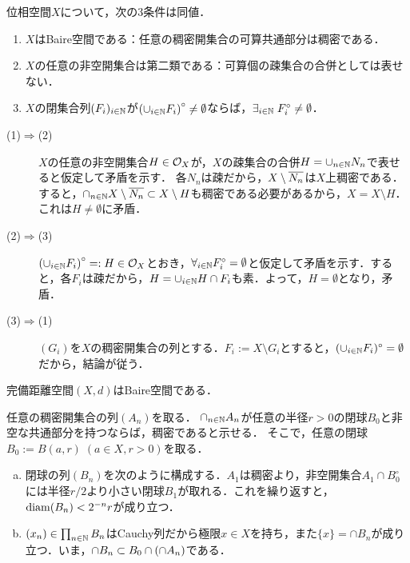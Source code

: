 \documentclass[uplatex,dvipdfmx]{jsreport}
\begin{document}
\begin{theorem}[Baire空間の特徴付け]
    位相空間$X$について，次の3条件は同値．
    \begin{enumerate}
        \item $X$はBaire空間である：任意の稠密開集合の可算共通部分は稠密である．
        \item $X$の任意の非空開集合は第二類である：可算個の疎集合の合併としては表せない．
        \item $X$の閉集合列$(F_i)_{i\in\mathbb{N}}$が$\left(\cup_{i\in\mathbb{N}}F_i\right)^\circ\ne\emptyset$ならば，$\exists_{i\in\mathbb{N}}\;F_i^\circ\ne\emptyset$．
    \end{enumerate}
\end{theorem}
\begin{Proof}\mbox{}
    \begin{description}
        \item[(1)$\Rightarrow$(2)] $X$の任意の非空開集合$H\in\mathcal{O}_X$が，$X$の疎集合の合併$H=\cup_{n\in\mathbb{N}}N_n$で表せると仮定して矛盾を示す．
        各$N_n$は疎だから，$X\setminus\overline{N_n}$は$X$上稠密である．
        すると，$\cap_{n\in\mathbb{N}}X\setminus\overline{N_n}\subset X\setminus H$も稠密である必要があるから，$X=X\setminus H$．これは$H\ne\emptyset$に矛盾．
        \item[(2)$\Rightarrow$(3)] $\left(\cup_{i\in\mathbb{N}}F_i\right)^\circ=:H\in\mathcal{O}_X$とおき，$\forall_{i\in\mathbb{N}}F_i^\circ=\emptyset$と仮定して矛盾を示す．すると，各$F_i$は疎だから，$H=\cup_{i\in\mathbb{N}}H\cap F_i$も素．よって，$H=\emptyset$となり，矛盾．
        \item[(3)$\Rightarrow$(1)] $(G_i)$を$X$の稠密開集合の列とする．$F_i:=X\setminus G_i$とすると，$(\cup_{i\in\mathbb{N}}F_i)^\circ=\emptyset$だから，結論が従う．
    \end{description}
\end{Proof}

\begin{proposition}
    完備距離空間$(X,d)$はBaire空間である．
\end{proposition}
\begin{Proof}
    任意の稠密開集合の列$(A_n)$を取る．
    $\cap_{n\in\mathbb{N}}A_n$が任意の半径$r>0$の閉球$B_0$と非空な共通部分を持つならば，稠密であると示せる．
    そこで，任意の閉球$B_0:=B(a,r)\;(a\in X,r>0)$を取る．
    \begin{enumerate}[(a)]
        \item 閉球の列$(B_n)$を次のように構成する．$A_1$は稠密より，非空開集合$A_1\cap B_0^\circ$には半径$r/2$より小さい閉球$B_1$が取れる．これを繰り返すと，$\mathrm{diam}(B_n)<2^{-n}r$が成り立つ．
        \item $(x_n)\in\prod_{n\in\mathbb{N}}B_n$はCauchy列だから極限$x\in X$を持ち，また$\{x\}=\cap B_n$が成り立つ．いま，$\cap B_n\subset B_0\cap\left(\cap A_n\right)$である．
    \end{enumerate}
\end{Proof}
\end{document}
